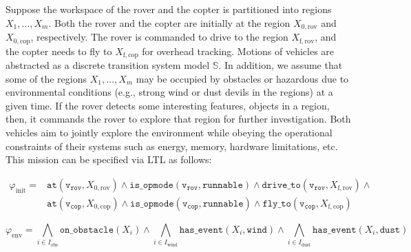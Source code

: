 \documentclass[10pt,letterpaper]{article}
\newcommand{\fOnObstacle}[1]{\ensuremath{ \mathtt{on\_obstacle} ( #1 ) }}
\newcommand{\fHasEvent}[2]{\ensuremath{ \mathtt{has\_event} ( #1, #2 ) }}
\newcommand{\fIsOpmode}[2]{\ensuremath{ \mathtt{is\_opmode} (#1,#2) }}
\newcommand{\fAtPose}[2]{\ensuremath{ \mathtt{at} ( #1, #2 ) }}
\newcommand{\fCommandDriveTo}[2]{\ensuremath{ \mathtt{drive\_to} (#1, #2) }}
\newcommand{\fCommandFlyTo}[2]{\ensuremath{ \mathtt{fly\_to} (#1, #2) }}
\newcommand{\vRover}{\ensuremath{\mathtt{v_{rov}}}}
\newcommand{\vCopter}{\ensuremath{\mathtt{v_{cop}}}}
\newcommand{\cnstWind}{\ensuremath{\mathtt{wind}}}
\newcommand{\cnstDust}{\ensuremath{\mathtt{dust}}}
\newcommand{\cnstRunnable}{\ensuremath{\mathtt{runnable}}}
\newcommand{\vXInitRover}{\ensuremath{X_{\mathrm{0, rov}}}}
\newcommand{\vXInitCopter}{\ensuremath{X_{\mathrm{0, cop}}}}
\newcommand{\vXGoalRover}{\ensuremath{X_{\mathrm{f, rov}}}}
\newcommand{\vXGoalCopter}{\ensuremath{X_{\mathrm{f, cop}}}}
\begin{document}
Suppose the workspace of the rover and the copter is partitioned into regions $X_{1}, \ldots, X_{m}$. Both the rover and the copter are initially at the region $\vXInitRover$ and $\vXInitCopter$, respectively. The rover is commanded to drive to the region $\vXGoalRover$, and the copter needs to fly to $\vXGoalCopter$ for overhead tracking. Motions of vehicles are abstracted as a discrete transition system model $\mathbb{S}$. In addition, we assume that some of the regions $X_{1}, \ldots, X_{m}$ may be occupied by obstacles or hazardous due to environmental conditions (e.g., strong wind or dust devils in the regions) at a given time. If the rover detects some interesting features, objects in a region, then, it commands the rover to explore that region for further investigation. Both vehicles aim to jointly explore the environment while obeying the operational constraints of their systems such as energy, memory, hardware limitations, etc. This mission can be specified via LTL as follows:

\begin{align}
\varphi_{\mathrm{init}} =& \fAtPose{\vRover}{\vXInitRover} \land \fIsOpmode{\vRover}{\cnstRunnable} \land \fCommandDriveTo{\vRover}{\vXGoalRover} \land \\\nonumber
& \fAtPose{\vCopter}{\vXInitCopter} \land \fIsOpmode{\vCopter}{\cnstRunnable} \land \fCommandFlyTo{\vCopter}{\vXGoalCopter}
\end{align}


\begin{equation}
\varphi_{\mathrm{env}} =  \bigwedge_{i \in I_{\mathrm{obs}}} \fOnObstacle{X_{i}} \land \bigwedge_{i \in I_{\mathrm{wind}}} \fHasEvent{X_{i}}{\cnstWind} \land \bigwedge_{i \in I_{\mathrm{dust}}} \fHasEvent{X_{i}}{\cnstDust}
\end{equation}
\end{document}

